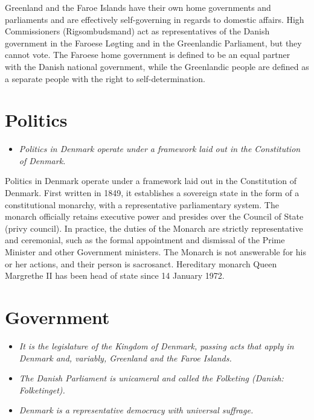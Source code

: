 Greenland and the Faroe Islands have their own home governments and
parliaments and are effectively self-governing in regards to domestic
affairs. High Commissioners (Rigsombudsmand) act as representatives of
the Danish government in the Faroese Løgting and in the Greenlandic
Parliament, but they cannot vote. The Faroese home government is defined
to be an equal partner with the Danish national government, while the
Greenlandic people are defined as a separate people with the right to
self-determination.

\section{Politics}\label{politics}

\begin{itemize}
\item
  \emph{Politics in Denmark operate under a framework laid out in the
  Constitution of Denmark.}
\end{itemize}

Politics in Denmark operate under a framework laid out in the
Constitution of Denmark. First written in 1849, it establishes a
sovereign state in the form of a constitutional monarchy, with a
representative parliamentary system. The monarch officially retains
executive power and presides over the Council of State (privy council).
In practice, the duties of the Monarch are strictly representative and
ceremonial, such as the formal appointment and dismissal of the Prime
Minister and other Government ministers. The Monarch is not answerable
for his or her actions, and their person is sacrosanct. Hereditary
monarch Queen Margrethe II has been head of state since 14 January 1972.

\section{Government}\label{government}

\begin{itemize}
\item
  \emph{It is the legislature of the Kingdom of Denmark, passing acts
  that apply in Denmark and, variably, Greenland and the Faroe Islands.}
\item
  \emph{The Danish Parliament is unicameral and called the Folketing
  (Danish: Folketinget).}
\item
  \emph{Denmark is a representative democracy with universal suffrage.}
\end{itemize}

